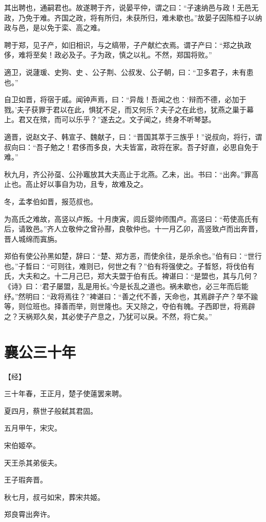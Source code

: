 \documentclass[a4paper,12pt,UTF8,twoside]{ctexbook}
\begin{document}
其出聘也，通嗣君也。故遂聘于齐，说晏平仲，谓之曰：“子速纳邑与政！无邑无政，乃免于难。齐国之政，将有所归，未获所归，难未歇也。”故晏子因陈桓子以纳政与邑，是以免于栾、高之难。

聘于郑，见子产，如旧相识，与之缟带，子产献纻衣焉。谓子产曰：“郑之执政侈，难将至矣！政必及子。子为政，慎之以礼。不然，郑国将败。”

適卫，说蘧瑗、史狗、史、公子荆、公叔发、公子朝，曰：“卫多君子，未有患也。”

自卫如晋，将宿于戚。闻钟声焉，曰：“异哉！吾闻之也：‘辩而不德，必加于戮。’夫子获罪于君以在此，惧犹不足，而又何乐？夫子之在此也，犹燕之巢于幕上。君又在殡，而可以乐乎？”遂去之。文子闻之，终身不听琴瑟。

適晋，说赵文子、韩宣子、魏献子，曰：“晋国其萃于三族乎！”说叔向，将行，谓叔向曰：“吾子勉之！君侈而多良，大夫皆富，政将在家。吾子好直，必思自免于难。”

秋九月，齐公孙虿、公孙竈放其大夫高止于北燕。乙未，出。书曰：“出奔。”罪高止也。高止好以事自为功，且专，故难及之。

冬，孟孝伯如晋，报范叔也。

为高氏之难故，高竖以卢叛。十月庚寅，闾丘婴帅师围卢。高竖曰：“苟使高氏有后，请致邑。”齐人立敬仲之曾孙酀，良敬仲也。十一月乙卯，高竖致卢而出奔晋，晋人城绵而寘旃。

郑伯有使公孙黑如楚，辞曰：“楚、郑方恶，而使余往，是杀余也。”伯有曰：“世行也。”子晳曰：“可则往，难则已，何世之有？”伯有将强使之。子晳怒，将伐伯有氏，大夫和之。十二月己巳，郑大夫盟于伯有氏。裨谌曰：“是盟也，其与几何？《诗》曰：‘君子屡盟，乱是用长。’今是长乱之道也。祸未歇也，必三年而后能纾。”然明曰：“政将焉往？”裨谌曰：“善之代不善，天命也，其焉辟子产？举不踰等，则位班也。择善而举，则世隆也。天又除之，夺伯有魄。子西即世，将焉辟之？天祸郑久矣，其必使子产息之，乃犹可以戾。不然，将亡矣。”

\chapter{襄公三十年}


【经】

三十年春，王正月，楚子使薳罢来聘。

夏四月，蔡世子般弑其君固。

五月甲午，宋灾。

宋伯姬卒。

天王杀其弟佞夫。

王子瑕奔晋。

秋七月，叔弓如宋，葬宋共姬。

郑良霄出奔许。
\end{document}
